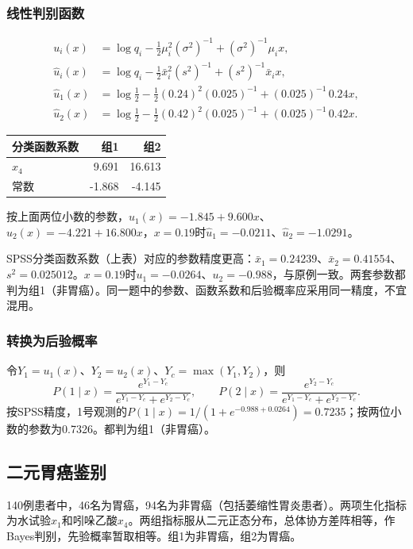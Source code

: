 \subsubsection{线性判别函数}
\begin{align*}
u_i(x)&=\log q_i-\frac12\mu_i^{2}(\sigma^2)^{-1}+(\sigma^2)^{-1}\mu_ix,\\
\widehat u_i(x)&=\log q_i-\frac12\bar x_i^{2}(s^2)^{-1}+(s^2)^{-1}\bar x_ix,\\
\widehat u_1(x)&=\log\frac12-\frac12(0.24)^2(0.025)^{-1}+(0.025)^{-1}\,0.24x,\\
\widehat u_2(x)&=\log\frac12-\frac12(0.42)^2(0.025)^{-1}+(0.025)^{-1}\,0.42x.
\end{align*}
\begin{center}\begin{tabular}{lrr}\toprule
{\bfseries 分类函数系数}&{\bfseries 组1}&{\bfseries 组2}\\\midrule
$x_4$&9.691&16.613\\常数&-1.868&-4.145\\\bottomrule
\end{tabular}\end{center}
按上面两位小数的参数，$\widehat u_1(x)=-1.845+9.600x$、$\widehat u_2(x)=-4.221+16.800x$，$x=0.19$时$\widehat u_1=-0.0211$、$\widehat u_2=-1.0291$。

SPSS分类函数系数（上表）对应的参数精度更高：$\bar x_1=0.24239$、$\bar x_2=0.41554$、$s^2=0.025012$。$x=0.19$时$u_1=-0.0264$、$u_2=-0.988$，与原例一致。两套参数都判为组1（非胃癌）。同一题中的参数、函数系数和后验概率应采用同一精度，不宜混用。
\subsubsection{转换为后验概率}
令$Y_1=u_1(x)$、$Y_2=u_2(x)$、$Y_c=\max(Y_1,Y_2)$，则
\[
P(1\mid x)=\frac{e^{Y_1-Y_c}}{e^{Y_1-Y_c}+e^{Y_2-Y_c}},\qquad
P(2\mid x)=\frac{e^{Y_2-Y_c}}{e^{Y_1-Y_c}+e^{Y_2-Y_c}}.
\]
按SPSS精度，1号观测的$P(1\mid x)=1/(1+e^{-0.988+0.0264})=0.7235$；按两位小数的参数为0.7326。都判为组1（非胃癌）。
\subsection{二元胃癌鉴别}
140例患者中，46名为胃癌，94名为非胃癌（包括萎缩性胃炎患者）。两项生化指标为水试验$x_1$和吲哚乙酸$x_4$。两组指标服从二元正态分布，总体协方差阵相等，作Bayes判别，先验概率暂取相等。组1为非胃癌，组2为胃癌。
